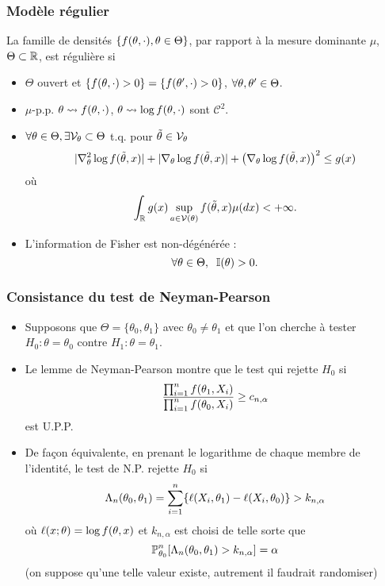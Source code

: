 \begin{frame}
\frametitle{Modèle régulier}
\begin{df} La famille de densités $\{f(\theta,\cdot),\theta \in \Theta\}$,  par rapport à la mesure dominante $\mu$, $\Theta \subset \operatorname{{\mathbb R}}$, est \alert{régulière} si
\begin{itemize}
\item $\Theta$ ouvert et $\{f(\theta, \cdot)>0\}=\{f(\theta', \cdot)>0\}$, $\forall \theta, \theta' \in \Theta$.
\item $\mu$-p.p. $\theta \leadsto f(\theta,\cdot)$, $\theta \leadsto \log f(\theta,\cdot)$ sont ${\mathcal C}^2$.
 \item $\forall \theta \in \Theta, \exists {\mathcal V}_\theta \subset \Theta$ t.q. pour $\tilde{\theta} \in {\mathcal V}_\theta$
$$|\nabla_\theta^{2}\log f(\tilde{\theta},x)|+|\nabla_\theta \log f(\tilde{\theta},x)|+\big(\nabla_\theta\log f(\tilde{\theta},x)\big)^2\leq g(x)$$
où
$$\int_{\mathbb{R}}g(x)\sup_{a \in {\mathcal V}(\theta)}f(\tilde{\theta},x)\mu(dx)<+\infty.$$
\item L'information de Fisher est non-dégénérée :
$$\forall \theta \in \Theta,\;\;\mathbb{I}(\theta) >0.$$
\end{itemize}
\end{df}
\end{frame}

\begin{frame}
\frametitle{Consistance du test de Neyman-Pearson}
\begin{itemize}
\item Supposons que $\Theta= \{\theta_0,\theta_1\}$ avec $\theta_0 \ne \theta_1$ et que l'on cherche à tester $H_0: \theta = \theta_0$ contre $H_1: \theta= \theta_1$.
\item Le lemme de Neyman-Pearson montre que le test qui rejette $H_0$ si
\[
\frac{\prod_{i=1}^n f(\theta_1,X_i)}{\prod_{i=1}^{n} f(\theta_0,X_i)} \geq c_{n,\alpha}
\]
est U.P.P.
\item De façon équivalente, en prenant le logarithme de chaque membre de l'identité, le test de N.P. rejette $H_0$ si
\[
\Lambda_n(\theta_0,\theta_1) = \sum_{i=1}^n \{ \ell(X_i,\theta_1) - \ell(X_i,\theta_0) \} > k_{n,\alpha}
\]
où $\ell(x;\theta)= \log f(\theta,x)$ et $k_{n,\alpha}$ est choisi de telle sorte que
\[
\operatorname{{\mathbb P}}_{\theta_0}^n [ \Lambda_n(\theta_0,\theta_1)  > k_{n,\alpha}] = \alpha
\]
(on suppose qu'une telle valeur existe, autrement il faudrait randomiser)
\end{itemize}
\end{frame}

